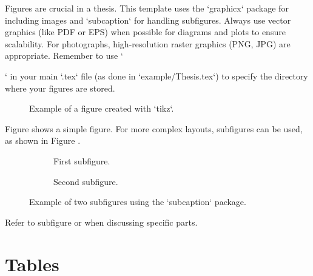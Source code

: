 Figures are crucial in a thesis. This template uses the `graphicx` package for including images and `subcaption` for handling subfigures.
Always use vector graphics (like PDF or EPS) when possible for diagrams and plots to ensure scalability. For photographs, high-resolution raster graphics (PNG, JPG) are appropriate.
Remember to use `\graphicspath{{Figures/}}` in your main `.tex` file (as done in `example/Thesis.tex`) to specify the directory where your figures are stored.

\begin{figure}[htbp]
    \centering
    \caption{Example of a figure created with `tikz`.}
    \label{fig:tikz_example}
\end{figure}

Figure  shows a simple figure. For more complex layouts, subfigures can be used, as shown in Figure .

\begin{figure}[htbp]
    \centering
    \begin{subfigure}[b]{0.45\textwidth}
        \centering
        \caption{First subfigure.}
        \label{fig:subfigure_a}
    \end{subfigure}
    \hfill %
    \begin{subfigure}[b]{0.45\textwidth}
        \centering
        \caption{Second subfigure.}
        \label{fig:subfigure_b}
    \end{subfigure}
    \caption{Example of two subfigures using the `subcaption` package.}
    \label{fig:subfigures_example}
\end{figure}

Refer to subfigure  or  when discussing specific parts.

\section{Tables}
\label{sec:tables}

